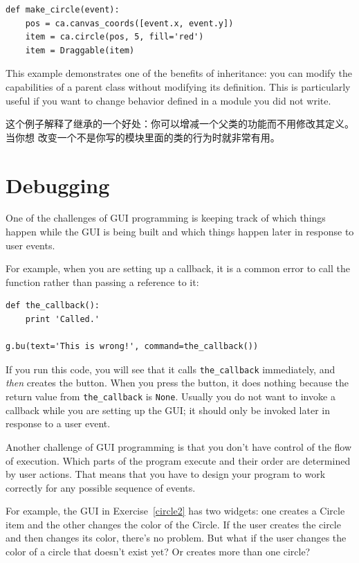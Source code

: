 \documentclass[10pt]{book}
\begin{document}
\begin{CJK}{UTF8}{gbsn}
\begin{verbatim}
def make_circle(event):
    pos = ca.canvas_coords([event.x, event.y])
    item = ca.circle(pos, 5, fill='red')
    item = Draggable(item)
\end{verbatim}
%
This example demonstrates one of the benefits of inheritance: you can
modify the capabilities of a parent class without modifying its
definition.  This is particularly useful if you want to change
behavior defined in a module you did not write.

这个例子解释了继承的一个好处：你可以增减一个父类的功能而不用修改其定义。当你想
改变一个不是你写的模块里面的类的行为时就非常有用。


\section{Debugging}

One of the challenges of GUI programming is keeping track of
which things happen while the GUI is being built and which
things happen later in response to user events.

For example, when you are setting up a callback, it is a common error
to call the function rather than passing a reference to it:

\begin{verbatim}
def the_callback():
    print 'Called.'

g.bu(text='This is wrong!', command=the_callback())
\end{verbatim}
%
If you run this code, you will see that it calls \verb"the_callback"
immediately, and {\em then} creates the button.  When you press the
button, it does nothing because the return value from 
\verb"the_callback" is {\tt None}.
Usually you do not want to invoke a callback while you are
setting up the GUI; it should only be invoked later in response to
a user event.

Another challenge of GUI programming is that you don't have control
of the flow of execution.  Which parts of the program execute
and their order are determined by user actions.
That means that you have to design your program to work correctly
for any possible sequence of events.

For example, the GUI in Exercise~\ref{circle2} has two widgets:
one creates a Circle item and the other changes the color of the
Circle.  If the user creates the circle and then changes its color,
there's no problem.  But what if the user changes the color of
a circle that doesn't exist yet?  Or creates more than one circle?


\end{CJK}
\end{document}
